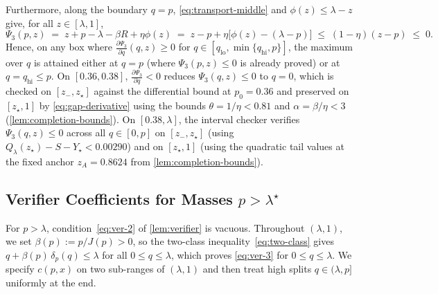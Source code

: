 \documentclass[11pt]{article}
\numberwithin{equation}{section}
\theoremstyle{plain}
\theoremstyle{definition}
\newcommand{\1}{\mathbf{1}}
\begin{document}
Furthermore, along the boundary $q = p$, \cref{eq:transport-middle} and $\phi(z) \le \lambda - z$ give, for all $z \in [\lambda, 1]$,
\[
  \Psi_3(p, z) \;=\; z + p - \lambda - \beta R + \eta\phi(z) \;=\; z - p + \eta\bigl[\phi(z) - (\lambda - p)\bigr] \;\le\; (1 - \eta)(z - p) \;\le\; 0.
\]
Hence, on any box where $\frac{\partial \Psi_3}{\partial q}(q, z) \ge 0$ for $q \in [q_{\mathrm{lo}}, \min\{q_{\mathrm{hi}}, p\}]$, the maximum over $q$ is attained either at $q = p$ (where $\Psi_3(p, z) \le 0$ is already proved) or at $q = q_{\mathrm{hi}} \le p$. On $[0.36, 0.38]$, $\frac{\partial \Psi_3}{\partial q} < 0$ reduces $\Psi_3(q, z) \le 0$ to $q = 0$, which is checked on $[z_-, z_\star]$ against the differential bound at $p_0 = 0.36$ and preserved on $[z_\star, 1]$ by \cref{eq:gap-derivative} using the bounds $\theta = 1/\eta < 0.81$ and $\alpha = \beta/\eta < 3$ (\cref{lem:completion-bounds}). On $[0.38, \lambda]$, the interval checker verifies $\Psi_3(q, z) \le 0$ across all $q \in [0, p]$ on $[z_-, z_\star]$ (using $Q_\lambda(z_\star) - S - Y_\star < 0.00290$) and on $[z_\star, 1]$ (using the quadratic tail values at the fixed anchor $z_A = 0.8624$ from \cref{lem:completion-bounds}).

\subsection{Verifier Coefficients for Masses \texorpdfstring{$p > \lambda^\star$}{p > lambda*}}
\label{app:large-masses}

For $p > \lambda$, condition~\eqref{eq:ver-2} of \cref{lem:verifier} is vacuous. Throughout $(\lambda, 1)$, we set $\beta(p) := p/J(p) > 0$, so the two-class inequality~\eqref{eq:two-class} gives $q + \beta(p)\,\delta_p(q) \le \lambda$ for all $0 \le q \le \lambda$, which proves \cref{eq:ver-3} for $0 \le q \le \lambda$. We specify $c(p, x)$ on two sub-ranges of $(\lambda, 1)$ and then treat high splits $q \in (\lambda, p]$ uniformly at the end.
\end{document}
